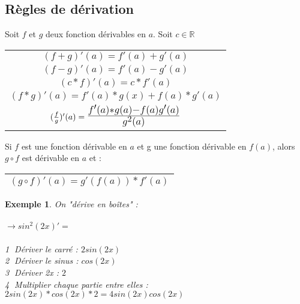 \documentclass[12pt, a4paper]{book}
\newtheorem*{exemple}{Exemple}
\def\mathLarge#1{\mbox{\LARGE $#1$}}
\begin{document}
\subsection{Règles de dérivation}
Soit $f$ et $g$ deux fonction dérivables en $a$. Soit $c \in \mathbb{R}$\\
\begin{center}
\begin{tabular}{ |c|}
    \hline
    $(f+g)'(a) = f'(a) + g'(a)$\\
    $(f-g)'(a) = f'(a) - g'(a)$\\
    $(c*f)'(a) = c*f'(a)$\\
    $(f*g)'(a) = f'(a)*g(x) + f(a)*g'(a)$\\
    $(\frac{f}{g})'(a) = \mathLarge{\frac{f'(a)*g(a) - f(a)g'(a)}{g^2(a)}}$\\
    \hline
\end{tabular}
\end{center}

Si $f$ est une fonction dérivable en $a$ et g une fonction dérivable en $f(a)$, alors $g \circ f$ est dérivable en $a$ et :\\
\begin{center}
    \begin{tabular}{ |c|}
        \hline
        $(g \circ f)'(a) = g'(f(a)) * f'(a)$\\
        \hline
    \end{tabular}
    \end{center}
\begin{exemple}
    On "dérive en boîtes" :\\
    \newline \\
    $\rightarrow sin^{2}(2x)' =$\\
    \newline \\
    \textcircled{1} Dériver le carré : $2sin(2x)$\\
    \textcircled{2} Dériver le sinus : $cos(2x)$\\
    \textcircled{3} Dériver 2x : $2$\\
    \textcircled{4} Multiplier chaque partie entre elles :$2sin(2x)*cos(2x)*2 = 4sin(2x)cos(2x)$\\
\end{exemple}
\newpage
\end{document}
